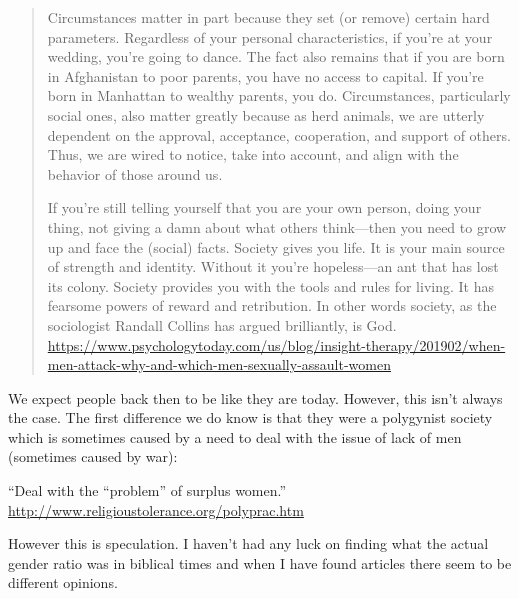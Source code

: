 \documentclass[11pt]{article}
\begin{document}
\begin{quote}
Circumstances matter in part because they set (or remove) certain hard parameters. Regardless of your personal characteristics, if you’re at your wedding, you’re going to dance. The fact also remains that if you are born in Afghanistan to poor parents, you have no access to capital. If you’re born in Manhattan to wealthy parents, you do. Circumstances, particularly social ones, also matter greatly because as herd animals, we are utterly dependent on the approval, acceptance, cooperation, and support of others. Thus, we are wired to notice, take into account, and align with the behavior of those around us.

If you’re still telling yourself that you are your own person, doing your thing, not giving a damn about what others think—then you need to grow up and face the (social) facts. Society gives you life. It is your main source of strength and identity. Without it you’re hopeless—an ant that has lost its colony. Society provides you with the tools and rules for living. It has fearsome powers of reward and retribution. In other words society, as the sociologist Randall Collins has argued brilliantly, is God.
\url{https://www.psychologytoday.com/us/blog/insight-therapy/201902/when-men-attack-why-and-which-men-sexually-assault-women}
\end{quote}

We expect people back then to be like they are today. However, this isn’t always the case. The first difference we do know is that they were a polygynist society which is sometimes caused by a need to deal with the issue of lack of men (sometimes caused by war):

“Deal with the “problem” of surplus women.”
\url{http://www.religioustolerance.org/polyprac.htm}

However this is speculation. I haven’t had any luck on finding what the actual gender ratio was in biblical times and when I have found articles there seem to be different opinions.
\end{document}
